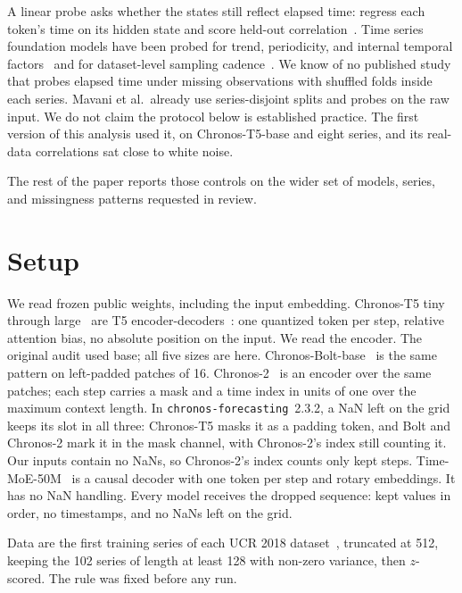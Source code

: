\documentclass{article}
\begin{document}
A linear probe asks whether the states still reflect elapsed time: regress each token's time on its hidden state and score held-out correlation~\citep{alain2017understanding,tenney2019bert,belinkov2022probing}.
Time series foundation models have been probed for trend, periodicity, and internal temporal factors~\citep{wilinski2024exploring,pandey2025internal} and for dataset-level sampling cadence~\citep{mavani2026observability}.
We know of no published study that probes elapsed time under missing observations with shuffled folds inside each series.
Mavani et al.\ already use series-disjoint splits and probes on the raw input.
We do not claim the protocol below is established practice.
The first version of this analysis used it, on Chronos-T5-base and eight series, and its real-data correlations sat close to white noise.

The rest of the paper reports those controls on the wider set of models, series, and missingness patterns requested in review.

\section{Setup}
\label{sec:setup}

We read frozen public weights, including the input embedding.
Chronos-T5 tiny through large~\citep{ansari2024chronos} are T5 encoder-decoders~\citep{raffel2020t5}: one quantized token per step, relative attention bias, no absolute position on the input.
We read the encoder.
The original audit used base; all five sizes are here.
Chronos-Bolt-base~\citep{chronosbolt} is the same pattern on left-padded patches of 16.
Chronos-2~\citep{ansari2025chronos2} is an encoder over the same patches; each step carries a mask and a time index in units of one over the maximum context length.
In \texttt{chronos-forecasting}~2.3.2, a NaN left on the grid keeps its slot in all three: Chronos-T5 masks it as a padding token, and Bolt and Chronos-2 mark it in the mask channel, with Chronos-2's index still counting it.
Our inputs contain no NaNs, so Chronos-2's index counts only kept steps.
Time-MoE-50M~\citep{shi2025timemoe} is a causal decoder with one token per step and rotary embeddings.
It has no NaN handling.
Every model receives the dropped sequence: kept values in order, no timestamps, and no NaNs left on the grid.

Data are the first training series of each UCR 2018 dataset~\citep{dau2019ucr}, truncated at 512, keeping the 102 series of length at least 128 with non-zero variance, then $z$-scored.
The rule was fixed before any run.
\end{document}
